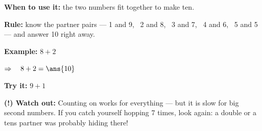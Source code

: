 \documentclass[12pt]{article}
\begin{document}
\begin{formulabox}
\textbf{When to use it:} the two numbers fit together to make ten.\par
\textbf{Rule:} know the partner pairs --- 1 and 9, \ 2 and 8, \ 3 and 7, \ 4
and 6, \ 5 and 5 --- and answer 10 right away.
\end{formulabox}

\begin{examplebox}
\textbf{Example:} \quad $8 + 2$

$\Rightarrow\quad 8 + 2 = \ans{10}$
\end{examplebox}

\begin{tryitbox}
\textbf{Try it:} \quad $9 + 1$\\[2pt]
\end{tryitbox}

\begin{watchoutbox}
\textbf{(!) Watch out:} Counting on works for everything --- but it is slow
for big second numbers. If you catch yourself hopping 7 times, look again:
a double or a tens partner was probably hiding there!
\end{watchoutbox}
\end{document}
